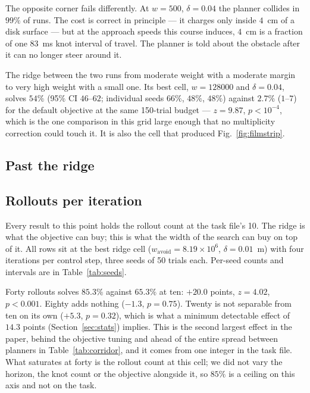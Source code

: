 \documentclass[conference]{IEEEtran}
\begin{document}
The opposite corner fails differently. At $w = 500$, $\delta = 0.04$ the planner
collides in $99\%$ of runs. The cost is correct in principle --- it charges only
inside $4$~cm of a disk surface --- but at the approach speeds this course
induces, $4$~cm is a fraction of one $83$~ms knot interval of travel. The planner
is told about the obstacle after it can no longer steer around it.

The ridge between the two runs from moderate weight with a moderate margin to
very high weight with a small one. Its best cell, $w = 128000$ and
$\delta = 0.04$, solves $54\%$ (95\% CI $46$--$62$; individual seeds $66\%$,
$48\%$, $48\%$) against $2.7\%$ ($1$--$7$) for the default objective at the same
150-trial budget --- $z = 9.87$, $p < 10^{-4}$, which is the one comparison in
this grid large enough that no multiplicity correction could touch it. It is
also the cell that produced Fig.~\ref{fig:filmstrip}.

\subsection{Past the ridge}
\label{sec:ridge}



\subsection{Rollouts per iteration}
\label{sec:rollouts}

Every result to this point holds the rollout count at the task file's 10. The
ridge is what the objective can buy; this is what the width of the search can
buy on top of it. All rows sit at the best ridge cell
($w_{\mathrm{avoid}} = 8.19\times10^{6}$, $\delta = 0.01$~m) with four
iterations per control step, three seeds of 50 trials each. Per-seed counts and
intervals are in Table~\ref{tab:seeds}.



Forty rollouts solves $85.3\%$ against $65.3\%$ at ten: $+20.0$ points,
$z = 4.02$, $p < 0.001$. Eighty adds nothing ($-1.3$, $p = 0.75$). Twenty is not
separable from ten on its own ($+5.3$, $p = 0.32$), which is what a minimum
detectable effect of $14.3$ points (Section~\ref{sec:stats}) implies. This is
the second largest effect in the paper, behind the objective tuning and ahead of
the entire spread between planners in Table~\ref{tab:corridor}, and it comes
from one integer in the task file. What saturates at forty is the rollout count
at this cell; we did not vary the horizon, the knot count or the objective
alongside it, so $85\%$ is a ceiling on this axis and not on the task.
\end{document}
